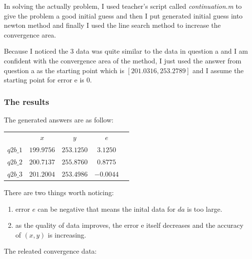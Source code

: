 \documentclass[11pt]{article}
\begin{document}
In solving the actually problem, I used teacher's script called \textit{continuation.m} to give the problem a good initial guess and then I put generated initial guess into newton method and finally I used the line search method to increase the convergence area.

Because I noticed the 3 data was quite similar to the data in question a and I am confident with the convergence area of the method, I just used the answer from question a as the starting point which is $[201.0316,253.2789]$ and I assume the starting point for error e is 0.

\subsubsection{The results}
The generated answers are as follow:

\begin{center}
\begin{tabular}{ccccc}
& $x$&$y$&$e$\\ 
$q2b\_1$& $199.9756$& $253.1250$& $3.1250$\\
$q2b\_2$& $200.7137$& $255.8760$& $0.8775$\\
$q2b\_3$& $201.2004$& $253.4986$& $-0.0044$
\end{tabular}
\end{center}

There are two things worth noticing:
\begin{enumerate}
\item error $e$ can be negative that means the inital data for $da$ is too large.
\item as the quality of data improves, the error e itself decreases and the accuracy of $(x,y)$ is increasing.
\end{enumerate}

The releated convergence data:
\end{document}
